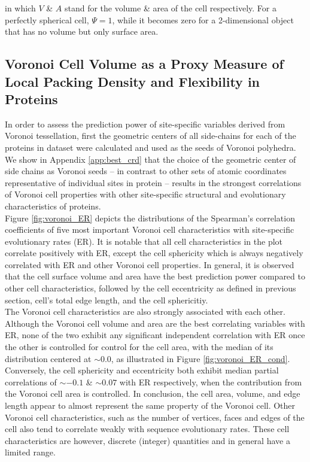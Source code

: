 \documentclass[11pt]{article}
\begin{document}
    \noindent in which $V$ \& $A$ stand for the volume \& area of the cell respectively. For a perfectly spherical cell, $\Psi=1$, while it becomes zero for a 2-dimensional object that has no volume but only surface area.

    \subsection*{Voronoi Cell Volume as a Proxy Measure of Local Packing Density and Flexibility in Proteins}



    In order to assess the prediction power of site-specific variables derived from Voronoi tessellation, first the geometric centers of all side-chains for each of the proteins in dataset were calculated and used as the seeds of Voronoi polyhedra. We show in Appendix \ref{app:best_crd} that the choice of the geometric center of side chains as Voronoi seeds -- in contrast to other sets of atomic coordinates representative of individual sites in protein -- results in the strongest correlations of Voronoi cell properties with other site-specific structural and evolutionary characteristics of proteins.  \\

    Figure \ref{fig:voronoi_ER} depicts the distributions of the Spearman's correlation coefficients of five most important Voronoi cell characteristics with site-specific evolutionary rates (ER). It is notable that all cell characteristics in the plot correlate positively with ER, except the cell sphericity which is always negatively correlated with ER and other Voronoi cell properties. In general, it is observed that the cell surface volume and area have the best prediction power compared to other cell characteristics, followed by the cell eccentricity as defined in previous section, cell's total edge length, and the cell sphericitiy. \\

    The Voronoi cell characteristics are also strongly associated with each other. Although the Voronoi cell volume and area are the best correlating variables with ER, none of the two exhibit any significant independent correlation with ER once the other is controlled for control for the cell area, with the median of its distribution centered at $\sim0.0$, as illustrated in Figure \ref{fig:voronoi_ER_cond}. Conversely, the cell sphericity and eccentricity both exhibit median partial correlations of $\sim-0.1$ \& $\sim0.07$ with ER respectively, when the contribution from the Voronoi cell area is controlled. In conclusion, the cell area, volume, and edge length appear to almost represent the same property of the Voronoi cell. Other Voronoi cell characteristics, such as the number of vertices, faces and edges of the cell also tend to correlate weakly with sequence evolutionary rates. These cell characteristics are however, discrete (integer) quantities and in general have a limited range. \\
\end{document}
